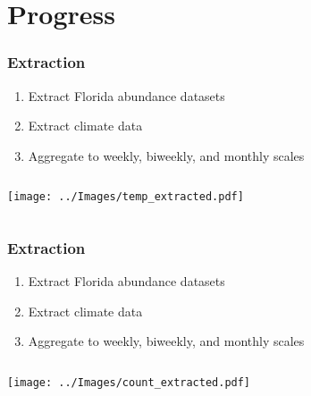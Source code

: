 \documentclass{beamer}
\begin{document}
\section{Progress}

\begin{frame}
\frametitle{Extraction}

\begin{enumerate}
	\item Extract Florida abundance datasets 
	
	\item Extract climate data 
	
	\item Aggregate to weekly, biweekly, and monthly scales	
\end{enumerate}
	

\vspace{0.7cm}
\begin{columns}
	\begin{column}{0.7\textwidth}
		\texttt{[image: ../Images/temp\_extracted.pdf]}
	\end{column}
	\begin{column}{0.3\textwidth}
		
	\end{column}
\end{columns}

\end{frame}

\begin{frame}
\frametitle{Extraction}

\begin{enumerate}
	\item Extract Florida abundance datasets 
	
	\item Extract climate data 
	
	\item Aggregate to weekly, biweekly, and monthly scales	
\end{enumerate}


\vspace{0.7cm}
\begin{columns}
	\begin{column}{0.7\textwidth}
		\texttt{[image: ../Images/count\_extracted.pdf]}
	\end{column}
	\begin{column}{0.3\textwidth}
		
	\end{column}
\end{columns}

\end{frame}
\end{document}
